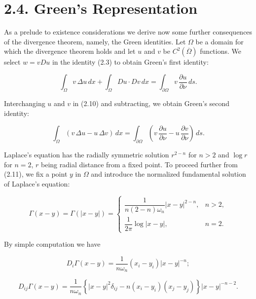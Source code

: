 


\section*{2.4. Green's Representation}

As a prelude to existence considerations we derive now some further consequences
of the divergence theorem, namely, the Green identities. Let $\Omega$ be a domain for
which the divergence theorem holds and let $u$ and $v$ be $C^2(\overline{\Omega})$ functions. We select
$w = vDu$ in the identity (2.3) to obtain Green's first identity:

\begin{equation}
\int_{\Omega} v\,\Delta u\,dx + \int_{\Omega} Du \cdot Dv\,dx = \int_{\partial \Omega} v\,\frac{\partial u}{\partial \nu}\,ds.
\tag{2.10}
\end{equation}

Interchanging $u$ and $v$ in (2.10) and subtracting, we obtain Green's second identity:

\begin{equation}
\int_{\Omega} (v\,\Delta u-u\,\Delta v)\,dx = \int_{\partial \Omega} \left(v\,\frac{\partial u}{\partial \nu}-u\,\frac{\partial v}{\partial \nu}\right)\,ds.
\tag{2.11}
\end{equation}

Laplace's equation has the radially symmetric solution $r^{2-n}$ for $n>2$ and $\log r$ for
$n=2$, $r$ being radial distance from a fixed point. To proceed further from (2.11),
we fix a point $y$ in $\Omega$ and introduce the normalized fundamental solution of Laplace's
equation:

\begin{equation}
\Gamma(x-y)=\Gamma(|x-y|)=
\begin{cases}
\dfrac{1}{n(2-n)\omega_n}|x-y|^{2-n}, & n>2,\\[1.2ex]
\dfrac{1}{2\pi}\log |x-y|, & n=2.
\end{cases}
\tag{2.12}
\end{equation}

By simple computation we have

\[
D_i\Gamma(x-y)=\dfrac{1}{n\omega_n}(x_i-y_i)|x-y|^{-n};
\]

\begin{equation}
D_{ij}\Gamma(x-y)=\dfrac{1}{n\omega_n}\left\{|x-y|^2\delta_{ij}-n(x_i-y_i)(x_j-y_j)\right\}|x-y|^{-n-2}.
\tag{2.13}
\end{equation}

